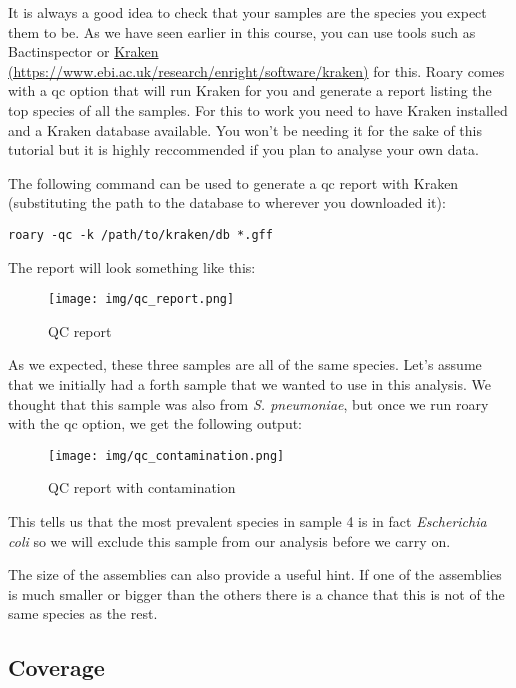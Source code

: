 \documentclass[11pt]{article}
\begin{document}
It is always a good idea to check that your samples are the species you
expect them to be. As we have seen earlier in this course, you can use
tools such as Bactinspector or
\href{https://www.ebi.ac.uk/research/enright/software/kraken}{Kraken
(https://www.ebi.ac.uk/research/enright/software/kraken)} for this.
Roary comes with a qc option that will run Kraken for you and generate a
report listing the top species of all the samples. For this to work you
need to have Kraken installed and a Kraken database available. You won't
be needing it for the sake of this tutorial but it is highly
reccommended if you plan to analyse your own data.

The following command can be used to generate a qc report with Kraken
(substituting the path to the database to wherever you downloaded it):

\begin{verbatim}
roary -qc -k /path/to/kraken/db *.gff
\end{verbatim}

The report will look something like this:

    \begin{figure}
\centering
\texttt{[image: img/qc\_report.png]}
\caption{QC report}
\end{figure}

    As we expected, these three samples are all of the same species. Let's
assume that we initially had a forth sample that we wanted to use in
this analysis. We thought that this sample was also from \textit{S.
pneumoniae}, but once we run roary with the qc option, we get the
following output:

    \begin{figure}
\centering
\texttt{[image: img/qc\_contamination.png]}
\caption{QC report with contamination}
\end{figure}

    This tells us that the most prevalent species in sample 4 is in fact
\textit{Escherichia coli} so we will exclude this sample from our analysis
before we carry on.

The size of the assemblies can also provide a useful hint. If one of the
assemblies is much smaller or bigger than the others there is a chance
that this is not of the same species as the rest.

\hypertarget{coverage}{%
\subsection{Coverage}\label{coverage}}
\end{document}
